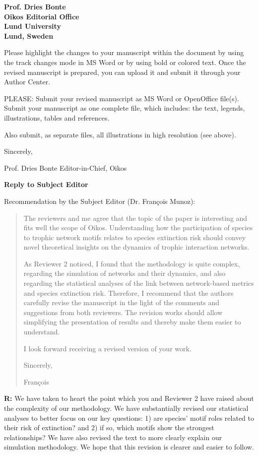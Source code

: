 \documentclass[12pt]{letter}
\begin{document}
\begin{letter}{\bf Prof. Dries Bonte\\
Oikos Editorial Office \\
Lund University \\
Lund, Sweden}



Please highlight the changes to your manuscript within the document by using the track changes mode in MS Word or by using bold or colored text. Once the revised manuscript is prepared, you can upload it and submit it through your Author Center.


PLEASE: Submit your revised manuscript as MS Word or OpenOffice file(s). Submit your manuscript as one complete file, which includes: the text, legends, illustrations, tables and references.

Also submit, as separate files, all illustrations in high resolution (see above).


Sincerely,

Prof. Dries Bonte
Editor-in-Chief, Oikos




\clearpage

{\large \textbf{Reply to Subject Editor}}

  Recommendation by the Subject Editor (Dr. François Munoz):
    \begin{quotation}    

  The reviewers and me agree that the topic of the paper is interesting and fits well the scope of Oikos.
  Understanding how the participation of species to trophic network motifs relates to species extinction risk should convey novel theoretical insights on the dynamics of trophic interaction networks.

  As Reviewer 2 noticed, I found that the methodology is quite complex, regarding the simulation of networks and their dynamics, and also regarding the statistical analyses of the link between network-based metrics and species extinction risk.
  Therefore, I recommend that the authors carefully revise the manuscript in the light of the comments and suggestions from both reviewers. The revision works should allow simplifying the presentation of results and thereby make them easier to understand.

  I look forward receiving a revised version of your work.

  Sincerely,

  François
  \end{quotation}
  
  \textbf{R:} We have taken to heart the point which you and Reviewer 2 have raised about the complexity of our methodology. We have substantially revised our statistical analyses to better focus on our key questions: 1) are species' motif roles related to their risk of extinction? and 2) if so, which motifs show the strongest relationships? We have also revised the text to more clearly explain our simulation methodology. We hope that this revision is clearer and easier to follow.


\end{letter}
\end{document}
